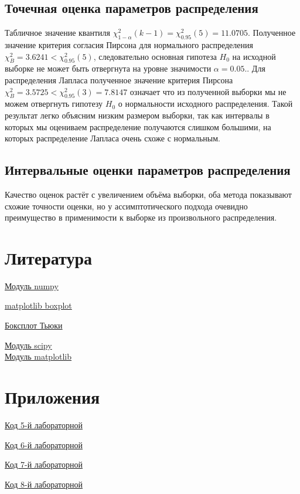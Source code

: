 \documentclass[a4]{article}
\begin{document}
\subsection{Точечная оценка параметров распределения}
Табличное значение квантиля  $\chi^2_{1-\alpha}(k-1)=\chi^2_{0.95}(5) = 11.0705$.
Полученное значение критерия согласия Пирсона для нормального распределения $\chi_B^2 = 3.6241 < \chi^2_{0.95}(5)$, следовательно основная гипотеза $H_0$ на исходной выборке не может быть отвергнута на уровне значимости $\alpha = 0.05.$. Для распределения Лапласа полученное значение критерия Пирсона $\chi_B^2 = 3.5725 < \chi^2_{0.95}(3) = 7.8147$ означает что из полученной выборки мы не можем отвергнуть гипотезу $H_0$ о нормальности исходного распределения. Такой результат легко объясним низким размером выборки, так как интервалы в которых мы оцениваем распределение получаются слишком большими, на которых распределение Лапласа очень схоже с нормальным.

\subsection{Интервальные оценки параметров распределения}

Качество оценок растёт с увеличением объёма выборки, оба метода показывают схожие точности оценки, но у ассимптотического подхода очевидно преимущество в применимости к выборке из произвольного распределения.

\section{Литература}

\href{https://physics.susu.ru/vorontsov/language/numpy.html}{Модуль numpy}

\href{https://matplotlib.org/3.1.1/api/_as_gen/matplotlib.pyplot.boxplot.html}{matplotlib boxplot}

\href{https://habr.com/ru/post/267123/}{Боксплот Тьюки}

\href{https://www.scipy.org/}{Модуль scipy}\\

\href{https://matplotlib.org/}{Модуль matplotlib}\\

\section{Приложения}

\href{https://github.com/dmitry-maltsov/PolyMatStat/blob/master/5/lab5.py}{Код 5-й лабораторной}

\href{https://github.com/dmitry-maltsov/PolyMatStat/blob/master/6/lab6.py}{Код 6-й лабораторной}

\href{https://github.com/dmitry-maltsov/PolyMatStat/blob/master/7/lab7.py}{Код 7-й лабораторной}

\href{https://github.com/dmitry-maltsov/PolyMatStat/blob/master/8/lab8.py}{Код 8-й лабораторной}
\end{document}
